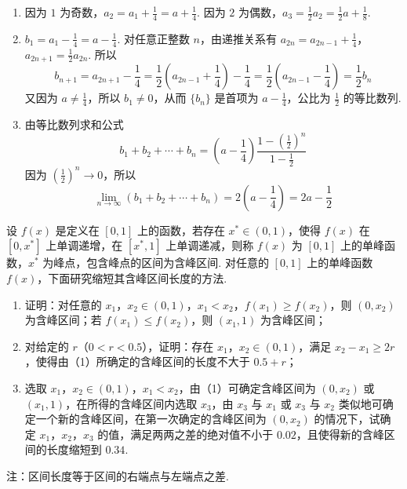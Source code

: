 \begin{solution}
\begin{enumerate}
\item 因为 \(1\) 为奇数，\(a_2=a_1+\frac14=a+\frac14\). 因为 \(2\) 为偶数，\(a_3=\frac12a_2=\frac12a+\frac18\).

\item \(b_1=a_1-\frac14=a-\frac14\). 对任意正整数 \(n\)，由递推关系有 \(a_{2n}=a_{2n-1}+\frac14\)，\(a_{2n+1}=\frac12a_{2n}\).
所以
\[
b_{n+1}=a_{2n+1}-\frac14=\frac12\left(a_{2n-1}+\frac14\right)-\frac14=\frac12\left(a_{2n-1}-\frac14\right)=\frac12b_n
\]
又因为 \(a\ne\frac14\)，所以 \(b_1\ne0\)，从而 \(\{b_n\}\) 是首项为 \(a-\frac14\)，公比为 \(\frac12\) 的等比数列.

\item 由等比数列求和公式
\[
b_1+b_2+\cdots+b_n=\left(a-\frac14\right)\frac{1-\left(\frac12\right)^n}{1-\frac12}
\]
因为 \(\left(\frac12\right)^n\to0\)，所以
\[
\lim_{n\to\infty}(b_1+b_2+\cdots+b_n)=2\left(a-\frac14\right)=2a-\frac12
\]
\end{enumerate}
\end{solution}

\begin{problem}
设 \(f(x)\) 是定义在 \([0,1]\) 上的函数，若存在 \(x^{*}\in(0,1)\)，使得 \(f(x)\) 在 \([0,x^{*}]\) 上单调递增，在 \([x^{*},1]\) 上单调递减，则称 \(f(x)\) 为 \([0,1]\) 上的单峰函数，\(x^{*}\) 为峰点，包含峰点的区间为含峰区间. 对任意的 \([0,1]\) 上的单峰函数 \(f(x)\)，下面研究缩短其含峰区间长度的方法.

\begin{enumerate}
\item 证明：对任意的 \(x_1\)，\(x_2\in(0,1)\)，\(x_1<x_2\)，\(f(x_1)\geqslant f(x_2)\)，则 \(\left(0,x_2\right)\) 为含峰区间；若 \(f(x_1)\leqslant f(x_2)\)，则 \(\left(x_1,1\right)\) 为含峰区间；
\item 对给定的 \(r\)（\(0<r<0.5\)），证明：存在 \(x_1\)，\(x_2\in(0,1)\)，满足 \(x_2-x_1\geqslant2r\)，使得由（1）所确定的含峰区间的长度不大于 \(0.5+r\)；
\item 选取 \(x_1\)，\(x_2\in(0,1)\)，\(x_1<x_2\)，由（1）可确定含峰区间为 \(\left(0,x_2\right)\) 或 \(\left(x_1,1\right)\)，在所得的含峰区间内选取 \(x_3\)，由 \(x_3\) 与 \(x_1\) 或 \(x_3\) 与 \(x_2\) 类似地可确定一个新的含峰区间，在第一次确定的含峰区间为 \(\left(0,x_2\right)\) 的情况下，试确定 \(x_1\)，\(x_2\)，\(x_3\) 的值，满足两两之差的绝对值不小于 \(0.02\)，且使得新的含峰区间的长度缩短到 \(0.34\).
\end{enumerate}

注：区间长度等于区间的右端点与左端点之差.
\end{problem}

